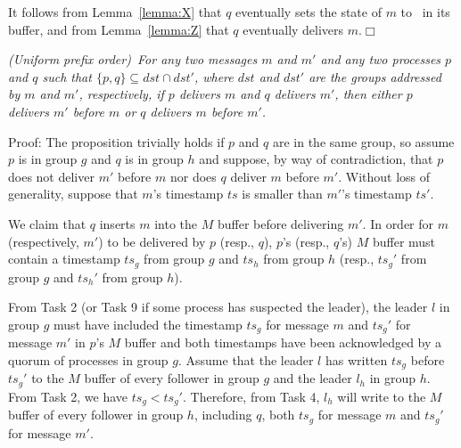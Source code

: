 It follows from Lemma~\ref{lemma:X} that $q$ eventually sets the state of $m$ to \ordered\ in its buffer, and 
from Lemma~\ref{lemma:Z} that $q$ eventually delivers $m$.\hfill$\Box$

\vspace{2mm}
\begin{proposition}
  \textit{(Uniform prefix order)~For any two messages $m$ and $m'$ and any two processes $p$ and $q$ such that $\lbrace p, q\rbrace \subseteq \mathit{dst} \cap \mathit{dst'}$, where $dst$ and $dst'$ are the groups addressed by $m$ and $m'$, respectively, if $p$ delivers $m$ and $q$ delivers $m'$, then either $p$ delivers $m'$ before $m$ or $q$ delivers $m$ before $m'$.}
\end{proposition}
\vspace{2mm}
\noindent
{\sc Proof:} 
The proposition trivially holds if $p$ and $q$ are in the same group, so assume $p$ is in group $g$ and $q$ is in group $h$ and suppose, by way of contradiction, that $p$ does not deliver $m'$ before $m$ nor does $q$ deliver $m$ before $m'$. 
Without loss of generality, suppose that $m$'s timestamp $ts$ is smaller than $m'$'s timestamp $ts'$. 

We claim that $q$ inserts $m$ into the $M$ buffer before delivering $m'$. 
In order for $m$ (respectively, $m'$) to be delivered by $p$ (resp., $q$), $p$'s (resp., $q$'s) $M$ buffer must contain a timestamp $ts_g$ from group $g$ and $ts_h$ from group $h$ (resp., $ts_g'$ from group $g$ and $ts_h'$ from group $h$).

From Task 2 (or Task 9 if some process has suspected the leader), the leader $l$ in group $g$ must have included the timestamp $ts_g$ for message $m$ and $ts_g'$ for message $m'$ in $p$'s $M$ buffer and both timestamps have been acknowledged by a quorum of processes in group $g$.
Assume that the leader $l$ has written $ts_g$ before $ts_g'$ to the $M$ buffer of every follower in group $g$ and the leader $l_h$ in group $h$. 
From Task 2, we have $ts_g < ts_g'$.
Therefore, from Task 4, $l_h$ will write to the $M$ buffer of every follower in group $h$, including $q$, both $ts_g$ for message $m$ and $ts_g'$ for message $m'$.

